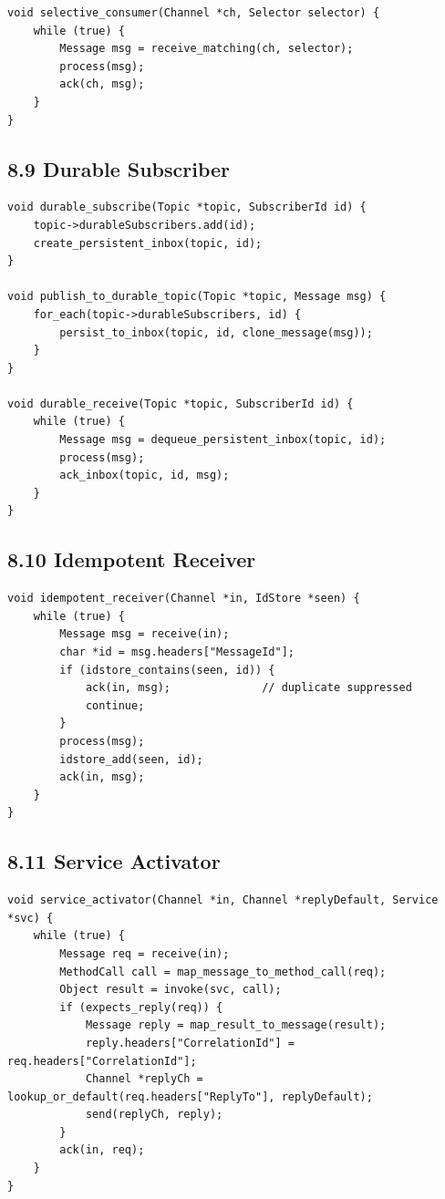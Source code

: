 \documentclass[11pt]{article}
\begin{document}
\begin{verbatim}
void selective_consumer(Channel *ch, Selector selector) {
    while (true) {
        Message msg = receive_matching(ch, selector);
        process(msg);
        ack(ch, msg);
    }
}
\end{verbatim}

\subsection{8.9 Durable Subscriber}\label{durable-subscriber}

\begin{verbatim}
void durable_subscribe(Topic *topic, SubscriberId id) {
    topic->durableSubscribers.add(id);
    create_persistent_inbox(topic, id);
}

void publish_to_durable_topic(Topic *topic, Message msg) {
    for_each(topic->durableSubscribers, id) {
        persist_to_inbox(topic, id, clone_message(msg));
    }
}

void durable_receive(Topic *topic, SubscriberId id) {
    while (true) {
        Message msg = dequeue_persistent_inbox(topic, id);
        process(msg);
        ack_inbox(topic, id, msg);
    }
}
\end{verbatim}

\subsection{8.10 Idempotent Receiver}\label{idempotent-receiver}

\begin{verbatim}
void idempotent_receiver(Channel *in, IdStore *seen) {
    while (true) {
        Message msg = receive(in);
        char *id = msg.headers["MessageId"];
        if (idstore_contains(seen, id)) {
            ack(in, msg);              // duplicate suppressed
            continue;
        }
        process(msg);
        idstore_add(seen, id);
        ack(in, msg);
    }
}
\end{verbatim}

\subsection{8.11 Service Activator}\label{service-activator}

\begin{verbatim}
void service_activator(Channel *in, Channel *replyDefault, Service *svc) {
    while (true) {
        Message req = receive(in);
        MethodCall call = map_message_to_method_call(req);
        Object result = invoke(svc, call);
        if (expects_reply(req)) {
            Message reply = map_result_to_message(result);
            reply.headers["CorrelationId"] = req.headers["CorrelationId"];
            Channel *replyCh = lookup_or_default(req.headers["ReplyTo"], replyDefault);
            send(replyCh, reply);
        }
        ack(in, req);
    }
}
\end{verbatim}
\end{document}
